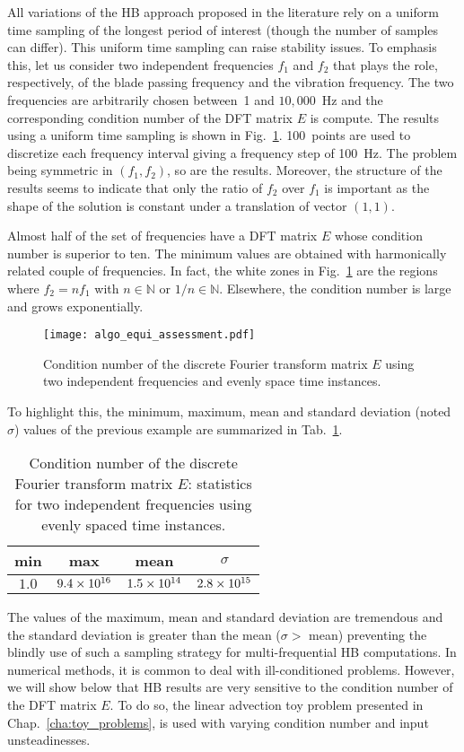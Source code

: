 All variations of the HB approach proposed in the literature rely on 
a uniform time sampling of the longest period of interest 
(though the number of samples can differ). 
This uniform time sampling can raise stability issues.
To emphasis this, let us consider two independent frequencies $f_1$
and $f_2$ that plays the role, respectively, of the blade passing frequency and
the vibration frequency. The two frequencies are arbitrarily chosen between~1
and $10,000$~Hz and the corresponding
condition number of the DFT matrix $E$ is compute. The results using a uniform time
sampling is shown in Fig.~\ref{fig:algo_equi_assessment}.
100~points are used to discretize each frequency interval giving a frequency step
of 100~Hz.
The problem being symmetric in $(f_1, f_2)$, so are the results.
Moreover, the structure of the results seems to indicate that only the
ratio of $f_2$ over $f_1$ is important as the shape of the
solution is constant under a translation of vector $(1,1)$.

Almost half of the set of frequencies have a DFT matrix $E$
whose condition number is superior to ten.
The minimum values are obtained with harmonically related couple
of frequencies. In fact, the white zones in Fig.~\ref{fig:algo_equi_assessment}
are the regions where $f_2 = n f_1$ with $n \in \mathbb{N}$ or $1/n \in \mathbb{N}$.
Elsewhere, the condition number is large and grows exponentially.
\begin{figure}
  \centering
  \texttt{[image: algo\_equi\_assessment.pdf]}
  \caption{Condition number of the discrete Fourier transform matrix $E$
  using two independent frequencies and evenly space time instances.}
  \label{fig:algo_equi_assessment}
\end{figure}
To highlight this, the minimum, maximum, mean and 
standard deviation (noted $\sigma$) values of the
previous example are summarized in Tab.~\ref{tab:hb_algo_equi}.
\begin{table}
  \centering
  \begin{tabular}{cccc}
    \toprule
    min & max & mean & $\sigma$ \\
    \midrule
    $1.0$ & $9.4\times 10^{16}$ & $1.5\times 10^{14}$ & $2.8\times 10^{15}$ \\
    \bottomrule
  \end{tabular}
  \caption{Condition number of the discrete Fourier transform matrix $E$: 
  statistics for two independent frequencies using evenly spaced time instances.}
  \label{tab:hb_algo_equi}
\end{table}  
The values of the maximum, mean and standard deviation are tremendous
and the standard deviation is greater than the mean
($\sigma > $ mean) preventing the blindly use of such a sampling strategy for 
multi-frequential HB computations.
In numerical methods, it is common to deal with ill-conditioned
problems. However, we will show below that HB results are 
very sensitive to the condition number of the DFT matrix $E$.
To do so, the linear advection toy problem
presented in Chap.~\ref{cha:toy_problems},
is used with varying condition number and input unsteadinesses.

